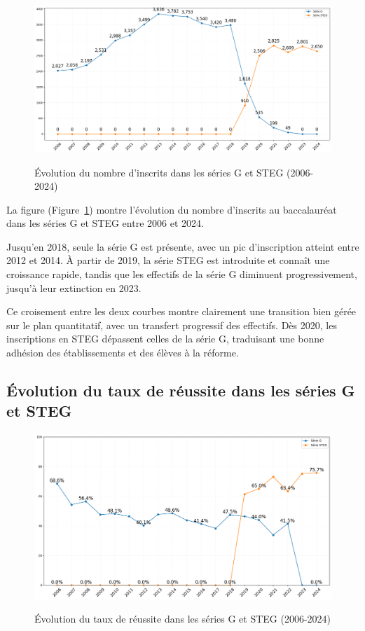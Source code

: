 \begin{figure}[ht]
\centering
\caption{Évolution du nombre d'inscrits dans les séries G et STEG (2006-2024)}
\includegraphics[width=1\textwidth]{figure/Inscrits_bac_STEG.png}
\label{fig:inscrits_STEG}
\end{figure}

La figure (Figure~\ref{fig:inscrits_STEG}) montre l’évolution du nombre d’inscrits au baccalauréat dans les séries G et STEG entre 2006 et 2024. 

Jusqu’en 2018, seule la série G est présente, avec un pic d’inscription atteint entre 2012 et 2014. À partir de 2019, la série STEG est introduite et connaît une croissance rapide, tandis que les effectifs de la série G diminuent progressivement, jusqu’à leur extinction en 2023.

Ce croisement entre les deux courbes montre clairement une transition bien gérée sur le plan quantitatif, avec un transfert progressif des effectifs. 
Dès 2020, les inscriptions en STEG dépassent celles de la série G, traduisant une bonne adhésion des établissements et des élèves à la réforme.

\subsection{Évolution du taux de réussite dans les séries G et STEG}

\begin{figure}[ht]
\centering
\caption{Évolution du taux de réussite dans les séries G et STEG (2006-2024)}
\includegraphics[width=1\textwidth]{figure/taux_bac_STEG.png}
\label{fig:taux_reussite_STEG}
\end{figure}

